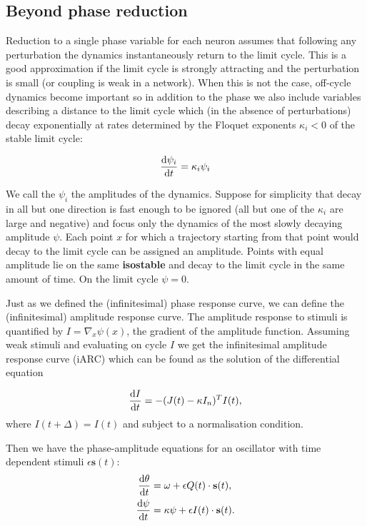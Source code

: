 \documentclass[11pt]{article}
\begin{document}
    \hypertarget{beyond-phase-reduction}{%
\subsection{Beyond phase reduction}\label{beyond-phase-reduction}}

Reduction to a single phase variable for each neuron assumes that
following any perturbation the dynamics instantaneously return to the
limit cycle. This is a good approximation if the limit cycle is strongly
attracting and the perturbation is small (or coupling is weak in a
network). When this is not the case, off-cycle dynamics become important
so in addition to the phase we also include variables describing a
distance to the limit cycle which (in the absence of perturbations)
decay exponentially at rates determined by the Floquet exponents
\(\kappa_i<0\) of the stable limit cycle:

\[\frac{{\rm d} \psi_i}{{\rm d} t} = \kappa_i \psi_i\]

We call the \(\psi_i\) the amplitudes of the dynamics. Suppose for
simplicity that decay in all but one direction is fast enough to be
ignored (all but one of the \(\kappa_i\) are large and negative) and
focus only the dynamics of the most slowly decaying amplitude \(\psi\).
Each point \(x\) for which a trajectory starting from that point would
decay to the limit cycle can be assigned an amplitude. Points with equal
amplitude lie on the same \textbf{isostable} and decay to the limit
cycle in the same amount of time. On the limit cycle \(\psi=0\).



Just as we defined the (infinitesimal) phase response curve, we can
define the (infinitesimal) amplitude response curve. The amplitude
response to stimuli is quantified by \(I =\nabla_x \psi(x)\), the
gradient of the amplitude function. Assuming weak stimuli and evaluating
on cycle \(I\) we get the infinitesimal amplitude response curve (iARC)
which can be found as the solution of the differential equation

\[\frac{{\rm d} I}{{\rm d} t} = -(J(t) - \kappa I_n)^T I(t),\] where
\(I(t+\Delta) = I(t)\) and subject to a normalisation condition.

Then we have the phase-amplitude equations for an oscillator with time
dependent stimuli \(\epsilon \mathbf{s}(t)\):
\begin{align*} \frac{{\rm d}\theta}{{\rm d} t} &= \omega + \epsilon Q(t) \cdot \mathbf{s}(t),\\
\frac{{\rm d}\psi}{{\rm d} t} &= \kappa \psi + \epsilon I(t) \cdot \mathbf{s}(t).\end{align*}
\end{document}
